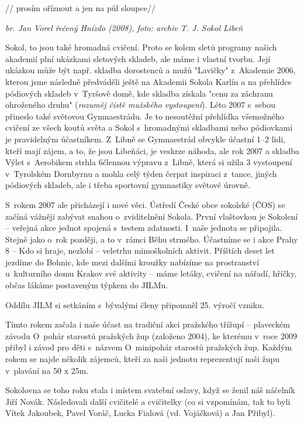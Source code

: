 \documentclass[a5paper, 11pt, twoside]{article}
\begin{document}
// prosím oříznout a jen na půl sloupce//

\textit{br. Jan Vorel řečený Hnízdo (2008), foto: archiv T. J. Sokol
Libeň}

Sokol, to jsou také hromadná cvičení. Proto se kolem sletů programy
našich akademií plní ukázkami sletových skladeb, ale máme i vlastní
tvorbu. Její ukázkou může být např. skladba dorostenců a mužů "Lavičky"
z~Akademie 2006, kterou jsme následně předváděli ještě na Akademii
Sokola Karlín a na přehlídce pódiových skladeb v~Tyršově domě, kde
skladba získala "cenu za záchranu ohroženého druhu" (\textit{rozuměj
čistě mužského vystoupení}). Léto 2007 s~sebou přineslo také světovou
Gymnaestrádu. Je to nesoutěžní přehlídka všemožného cvičení ze všech
koutů světa a Sokol s~hromadnými skladbami nebo pódiovkami je
pravidelným účastníkem. Z~Libně se Gymnaestrád obvykle účastní 1--2
lidi, kteří mají zájem, a to, že jsou Libeňáci, je veskrze náhoda, ale
rok 2007 a skladba Výlet s~Aerobikem strhla 6člennou výpravu z~Libně,
která si užila 3 vystoupení v~Tyrolském Dornbyrnu a mohla celý týden
čerpat inspiraci z~tance, jiných pódiových skladeb, ale i třeba
sportovní gymnastiky světové úrovně.

S~rokem 2007 ale přicházejí i nové věci. Ústředí České obce sokolské
(ČOS) se začíná vážněji zabývat snahou o~zviditelnění Sokola. První
vlaštovkou je Sokolení -- veřejná akce jednot spojená s~testem
zdatnosti. I~naše jednota se připojila. Stejně jako o~rok později, a to
v~rámci Běhu strmého. Účastníme se i akce Prahy 8 -- Kdo si hraje,
nezlobí -- veletrhu mimoškolních aktivit. Příštích deset let jezdíme do
Bohnic, kde mezi dalšími kroužky nabízíme na prostranství u~kulturního
domu Krakov své aktivity -- máme letáky, cvičení na nářadí, hříčky,
občas lákáme postaveným týpkem do JILMu.

Oddílu JILM si setkáním s~bývalými členy připomněl 25. výročí vzniku.

Tímto rokem začala i naše účast na tradiční akci pražského třížupí --
plaveckém závodu O~pohár starostů pražských žup (založeno 2004), ke
kterému v~roce 2009 přibyl i závod pro děti s~názvem O~minipohár
starostů pražských žup. Každým rokem se najde několik zájemců, kteří za
naši jednotu reprezentují naši župu v~plavání na 50 x 25m.

Sokolovna se toho roku stala i místem svatební oslavy, když se ženil náš
náčelník Jiří Novák. Následovali další cvičitelé a cvičitelky (co si
vzpomínám, tak to byli Vítek Jakoubek, Pavel Voráč, Lucka Fialová (vd.
Vojáčková) a Jan Přibyl).
\end{document}
